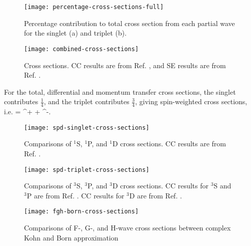 \documentclass[Dissertation.tex]{subfiles}
\begin{document}
\begin{figure}[H]
	\centering
	\texttt{[image: percentage-cross-sections-full]}
	\caption[Percentage contribution to total cross section]{Percentage contribution to total cross section from each partial wave for the singlet (a) and triplet (b).}
	\label{fig:percentage-cross-sections-full}
\end{figure}

\begin{figure}[H]
	\centering
	\texttt{[image: combined-cross-sections]}
	\caption[Cross sections.]{Cross sections. CC results are from Ref. \cite{Walters2004}, and SE results are from Ref. \cite{Hara1975}.}
	\label{fig:combined-cross-sections}
\end{figure}


For the total, differential and momentum transfer cross sections, the singlet contributes $\frac{1}{4}$, and the triplet contributes $\frac{3}{4}$, giving spin-weighted cross sections, i.e. \cite{Ward1987}
\beq
\label{eq:SpinWeightCS}
\sigma =  \sigma^+ +  \sigma^-.
\eeq


\label{sec:crosscompare}
\begin{figure}[H]
	\centering
	\texttt{[image: spd-singlet-cross-sections]}
	\caption[Comparisons of $^1$S, $^1$P, and $^1$D cross sections.]{Comparisons of $^1$S, $^1$P, and $^1$D cross sections. CC results are from Ref. \cite{Walters2004}.}
	\label{fig:spd-singlet-cross-sections}
\end{figure}

\begin{figure}[H]
	\centering
	\texttt{[image: spd-triplet-cross-sections]}
	\caption[Comparisons of $^3$S, $^3$P, and $^3$D cross sections.]{Comparisons of $^3$S, $^3$P, and $^3$D cross sections. CC results for $^3$S and $^3$P are from Ref. \cite{Walters2004}. CC results for $^3$D are from Ref. \cite{Blackwood2002}.}
	\label{fig:spd-triplet-cross-sections}
\end{figure}


\begin{figure}[H]
	\centering
	\texttt{[image: fgh-born-cross-sections]}
	\caption[Comparisons of F-, G-, and H-wave cross sections]{Comparisons of F-, G-, and H-wave cross sections between complex Kohn and Born approximation}
	\label{fig:fgh-born-cross-sections}
\end{figure}
\end{document}
